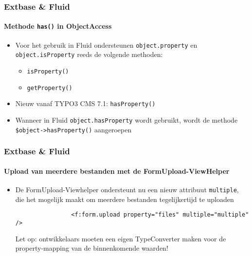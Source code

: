 \begin{frame}[fragile]
	\frametitle{Extbase \& Fluid}
	\framesubtitle{Methode \texttt{has()} in ObjectAccess}

	\begin{itemize}

		\item Voor het gebruik in Fluid ondersteunen \texttt{object.property} 
			en \texttt{object.isProperty} reeds de volgende methoden:

			\begin{itemize}
				\item \texttt{isProperty()}
				\item \texttt{getProperty()}
			\end{itemize}

		\item Nieuw vanaf TYPO3 CMS 7.1: \texttt{hasProperty()}
		\item Wanneer in Fluid \texttt{object.hasProperty} wordt gebruikt,\newline
			wordt de methode \texttt{\$object->hasProperty()} aangeroepen

	\end{itemize}

\end{frame}


\begin{frame}[fragile]
	\frametitle{Extbase \& Fluid}
	\framesubtitle{Upload van meerdere bestanden met de FormUpload-ViewHelper}

	\begin{itemize}

		\item De FormUpload-Viewhelper ondersteunt nu een nieuw attribuut \texttt{multiple}, 
			die het mogelijk maakt om meerdere bestanden tegelijkertijd te uploaden

			\begin{lstlisting}
				<f:form.upload property="files" multiple="multiple" />
			\end{lstlisting}

			\vspace{0.2cm}

			\begingroup
				\color{red}
					Let op: ontwikkelaars moeten een eigen TypeConverter maken 
					voor de property-mapping van de binnenkomende waarden!
			\endgroup

	\end{itemize}

\end{frame}

